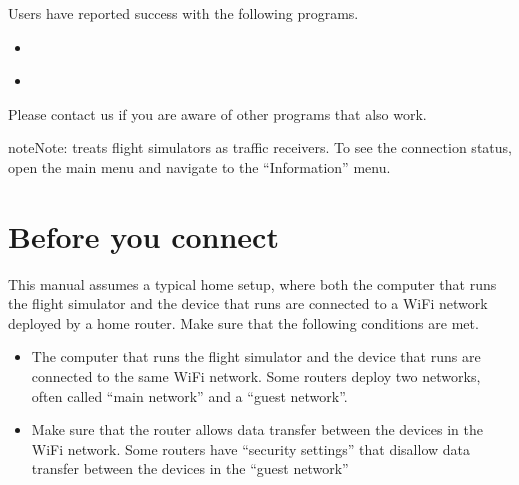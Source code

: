 \documentclass[letterpaper,10pt,english]{sphinxmanual}
\begin{document}
\sphinxAtStartPar
Users have reported success with the following programs.
\begin{itemize}
\item {} 
\sphinxAtStartPar
{}%
\begin{footnote}[16]\sphinxAtStartFootnote
{}
%
\end{footnote}

\item {} 
\sphinxAtStartPar
{}%
\begin{footnote}[17]\sphinxAtStartFootnote
{}
%
\end{footnote}

\end{itemize}

\sphinxAtStartPar
Please contact us if you are aware of other programs that also work.

\begin{sphinxadmonition}{note}{Note:}
\sphinxAtStartPar
{} treats flight simulators as traffic
receivers.  To see the connection status, open the main menu and navigate to
the “Information” menu.
\end{sphinxadmonition}


\section{Before you connect}
\label{\detokenize{02-steps/simulator:before-you-connect}}
\sphinxAtStartPar
This manual assumes a typical home setup, where both the computer that runs the
flight simulator and the device that runs  are
connected to a Wi\sphinxhyphen{}Fi network deployed by a home router.  Make sure that the
following conditions are met.
\begin{itemize}
\item {} 
\sphinxAtStartPar
The computer that runs the flight simulator and the device that runs  are connected to the same Wi\sphinxhyphen{}Fi network.  Some routers
deploy two networks, often called “main network” and a “guest network”.

\item {} 
\sphinxAtStartPar
Make sure that the router allows data transfer between the devices in the
Wi\sphinxhyphen{}Fi network.  Some routers have “security settings” that disallow data
transfer between the devices in the “guest network”

\end{itemize}
\end{document}
